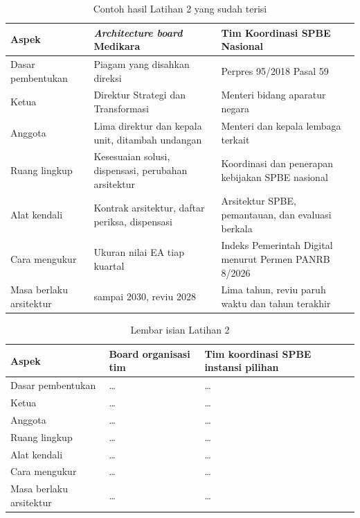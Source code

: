 \begin{table}[!htb]
  \centering
  \caption{Contoh hasil Latihan 2 yang sudah terisi}
  \label{tab:ch14-lat2-contoh}
  \begin{tabularx}{\textwidth}{>{\raggedright\arraybackslash}p{2.3cm}>{\raggedright\arraybackslash}X>{\raggedright\arraybackslash}X}
    \hline
    \textbf{Aspek} & \textbf{\textit{Architecture board} Medikara} &
      \textbf{Tim Koordinasi SPBE Nasional} \\
    \hline
    Dasar pembentukan & Piagam yang disahkan direksi & Perpres 95/2018 Pasal
      59 \\
    \hline
    Ketua & Direktur Strategi dan Transformasi & Menteri bidang aparatur
      negara \\
    \hline
    Anggota & Lima direktur dan kepala unit, ditambah undangan & Menteri dan
      kepala lembaga terkait \\
    \hline
    Ruang lingkup & Kesesuaian solusi, dispensasi, perubahan arsitektur &
      Koordinasi dan penerapan kebijakan SPBE nasional \\
    \hline
    Alat kendali & Kontrak arsitektur, daftar periksa, dispensasi &
      Arsitektur SPBE, pemantauan, dan evaluasi berkala \\
    \hline
    Cara mengukur & Ukuran nilai EA tiap kuartal & Indeks Pemerintah Digital
      menurut Permen PANRB 8/2026 \\
    \hline
    Masa berlaku arsitektur & 2026 sampai 2030, reviu 2028 & Lima tahun,
      reviu paruh waktu dan tahun terakhir \\
    \hline
  \end{tabularx}
\end{table}

\begin{table}[!htb]
  \centering
  \caption{Lembar isian Latihan 2}
  \label{tab:ch14-lat2-hasil}
  \begin{tabularx}{\textwidth}{>{\raggedright\arraybackslash}p{2.3cm}>{\raggedright\arraybackslash}X>{\raggedright\arraybackslash}X}
    \hline
    \textbf{Aspek} & \textbf{Board organisasi tim} & \textbf{Tim koordinasi
      SPBE instansi pilihan} \\
    \hline
    Dasar pembentukan & \dots & \dots \\
    \hline
    Ketua & \dots & \dots \\
    \hline
    Anggota & \dots & \dots \\
    \hline
    Ruang lingkup & \dots & \dots \\
    \hline
    Alat kendali & \dots & \dots \\
    \hline
    Cara mengukur & \dots & \dots \\
    \hline
    Masa berlaku arsitektur & \dots & \dots \\
    \hline
  \end{tabularx}
\end{table}

